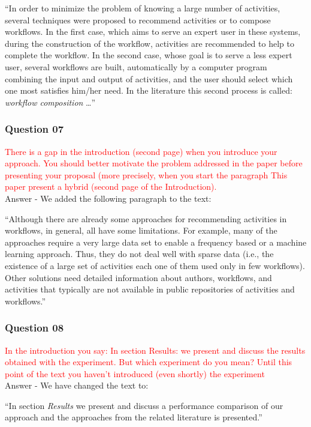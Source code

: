\documentclass{report}
\begin{document}
``In order to minimize the problem of knowing a large number of activities, several techniques were proposed to recommend activities or to compose workflows. In the first case, which aims to serve an expert user in these systems, during the construction of the workflow, activities are recommended to help to complete the workflow. In the second case, whose goal is to serve a less expert user, several workflows are built, automatically by a computer program combining the input and output of activities, and the user should select which one most satisfies him/her need. In the literature this second process is called: \emph{workflow composition} \ldots''

\subsubsection{Question 07}
\textcolor{red}{There is a gap in the introduction (second page) when you introduce your
	approach. You should better motivate the problem addressed in the paper
	before presenting your proposal (more precisely, when you start the
	paragraph This paper present a hybrid (second page of the Introduction).}
\\
Answer -  We added the following paragraph to the text:

``Although there are already some approaches for recommending activities in workflows, in general, all have some limitations. For example, many of the approaches require a very large data set to enable a frequency based or a machine learning approach. Thus, they do not deal well with sparse data (i.e., the existence of a large set of activities each one of them used only in few workflows). Other solutions need detailed information about authors, workflows, and activities that typically are not available in public repositories of activities and workflows.''


\subsubsection{Question 08}
\textcolor{red}{In the introduction you say: In section Results: we present and discuss the results obtained with the experiment. But which experiment do you mean? Until this point of the text you haven’t introduced (even shortly) the experiment}
\\
Answer -  We have changed the text to:

``In section \emph{Results} we present and discuss a performance comparison of our approach and the approaches from the related literature is presented.''
\end{document}
